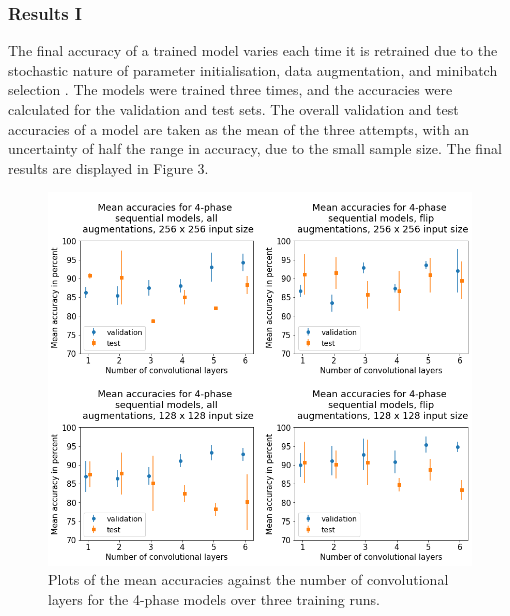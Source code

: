 \documentclass[12pt]{article}
\begin{document}
\subsubsection{Results I}
The final accuracy of a trained model varies each time it is retrained due to the stochastic nature of parameter initialisation, data augmentation, and minibatch selection \cite{Goodfellow16}. The models were trained three times, and the accuracies were calculated for the validation and test sets. The overall validation and test accuracies of a model are taken as the mean of the three attempts, with an uncertainty of half the range in accuracy, due to the small sample size. The final results are displayed in Figure 3.
\begin{figure}[!htb]
	\centering
    \includegraphics[width=6.6in]{images/4-phase_graphs.png}
    \caption{Plots of the mean accuracies against the number of convolutional layers for the 4-phase models over three training runs.}
\end{figure} 
\end{document}
